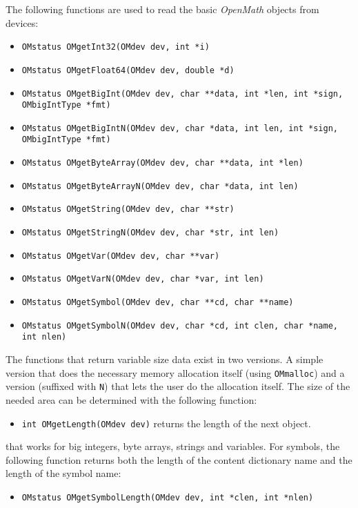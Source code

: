 \documentclass{article}
\newcommand{\OM}{{\sl OpenMath}}
\begin{document}
\noindent
The following functions are used to read the basic {\OM} objects from
devices: 
\begin{itemize} 
\item \verb+OMstatus OMgetInt32(OMdev dev, int *i)+
\item \verb+OMstatus OMgetFloat64(OMdev dev, double *d)+
\item 
\verb+OMstatus OMgetBigInt(OMdev dev, char **data, int *len, int *sign, OMbigIntType *fmt)+
\item 
\verb+OMstatus OMgetBigIntN(OMdev dev, char *data, int len, int *sign, OMbigIntType *fmt)+
\item \verb+OMstatus OMgetByteArray(OMdev dev, char **data, int *len)+
\item \verb+OMstatus OMgetByteArrayN(OMdev dev, char *data, int len)+
\item \verb+OMstatus OMgetString(OMdev dev, char **str)+
\item \verb+OMstatus OMgetStringN(OMdev dev, char *str, int len)+
\item \verb+OMstatus OMgetVar(OMdev dev, char **var)+
\item \verb+OMstatus OMgetVarN(OMdev dev, char *var, int len)+
\item \verb+OMstatus OMgetSymbol(OMdev dev, char **cd, char **name)+
\item \verb+OMstatus OMgetSymbolN(OMdev dev, char *cd, int clen, char *name, int nlen)+
\end{itemize} 
The functions that return variable size data exist in two versions. A simple
version that does the necessary memory allocation itself 
(using {\tt OMmalloc}) and a
version (suffixed with {\tt N}) that lets the user do the allocation itself.
The size of the needed area can be determined with the following function:
\begin{itemize} 
\item \verb+int OMgetLength(OMdev dev)+ returns the length of the next
object. 
\end{itemize} 
that works for big integers, byte arrays, strings and variables. For symbols,
the following function returns both the length of the content dictionary name
and the length of the symbol name:
\begin{itemize} 
\item \verb+OMstatus OMgetSymbolLength(OMdev dev, int *clen, int *nlen)+
\end{itemize} 
\end{document}
